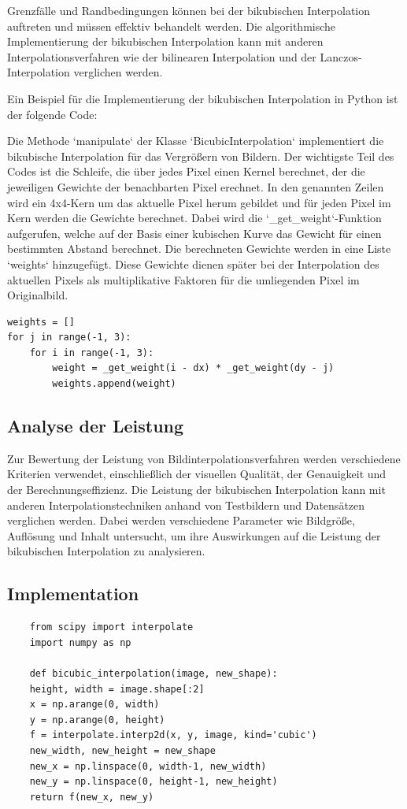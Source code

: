 Grenzfälle und Randbedingungen können bei der bikubischen Interpolation auftreten und müssen effektiv behandelt werden.
Die algorithmische Implementierung der bikubischen Interpolation kann mit anderen Interpolationsverfahren wie der bilinearen Interpolation und der Lanczos-Interpolation verglichen werden.

Ein Beispiel für die Implementierung der bikubischen Interpolation in Python ist der folgende Code:

Die Methode `manipulate` der Klasse `BicubicInterpolation` implementiert die bikubische Interpolation für das Vergrößern von Bildern.
Der wichtigste Teil des Codes ist die Schleife, die über jedes Pixel einen Kernel berechnet, der die jeweiligen Gewichte der benachbarten Pixel erechnet.
In den genannten Zeilen wird ein 4x4-Kern um das aktuelle Pixel herum gebildet und für jeden Pixel im Kern werden die Gewichte berechnet.
Dabei wird die `\_get\_weight`-Funktion aufgerufen, welche auf der Basis einer kubischen Kurve das Gewicht für einen bestimmten Abstand berechnet.
Die berechneten Gewichte werden in eine Liste `weights` hinzugefügt.
Diese Gewichte dienen später bei der Interpolation des aktuellen Pixels als multiplikative Faktoren für die umliegenden Pixel im Originalbild.


\begin{lstlisting}
weights = []
for j in range(-1, 3):
    for i in range(-1, 3):
        weight = _get_weight(i - dx) * _get_weight(dy - j)
        weights.append(weight)
\end{lstlisting}

\subsection{Analyse der Leistung}

    Zur Bewertung der Leistung von Bildinterpolationsverfahren werden verschiedene Kriterien verwendet, einschließlich der visuellen Qualität, der Genauigkeit und der Berechnungseffizienz. 
    Die Leistung der bikubischen Interpolation kann mit anderen Interpolationstechniken anhand von Testbildern und Datensätzen verglichen werden. 
    Dabei werden verschiedene Parameter wie Bildgröße, Auflösung und Inhalt untersucht, um ihre Auswirkungen auf die Leistung der bikubischen Interpolation zu analysieren. %



    \subsection{Implementation}
    \begin{lstlisting}
    from scipy import interpolate
    import numpy as np

    def bicubic_interpolation(image, new_shape):
    height, width = image.shape[:2]
    x = np.arange(0, width)
    y = np.arange(0, height)
    f = interpolate.interp2d(x, y, image, kind='cubic')
    new_width, new_height = new_shape
    new_x = np.linspace(0, width-1, new_width)
    new_y = np.linspace(0, height-1, new_height)
    return f(new_x, new_y)
    \end{lstlisting}


